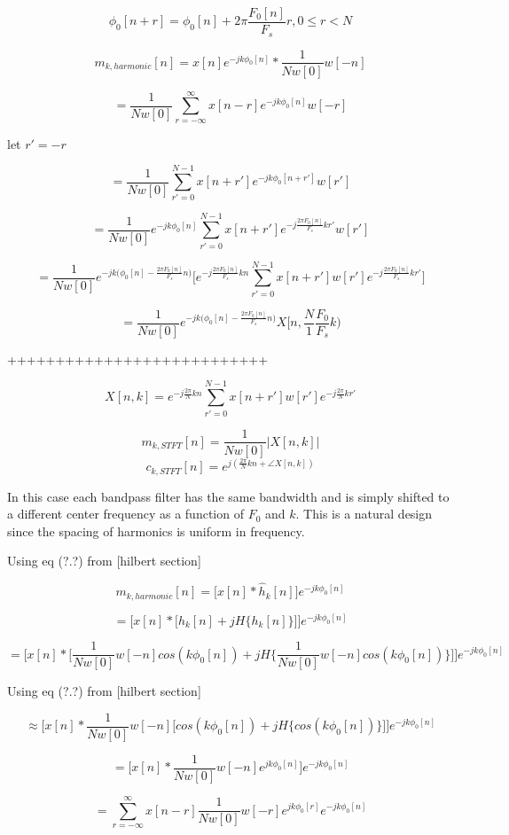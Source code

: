 \documentclass [11pt, proquest] {uwthesis}[2015/03/03]
\begin{document}
$$\phi_0[n + r] = \phi_0[n] + 2\pi \frac{F_0[n]}{F_s}r, 0 \leq r < N$$

$$m_{k,harmonic}[n] = x[n] e^{-jk\phi_0 [n]} *  \frac{1}{Nw[0]} w[-n]$$

$$= \frac{1}{Nw[0]} \sum_{r = -\infty}^\infty x[n - r] e^{-jk\phi_0 [n]} w[-r]$$

let $r' = -r$

$$= \frac{1}{Nw[0]} \sum_{r' = 0}^{N-1} x[n + r'] e^{-jk\phi_0 [n + r']} w[r']$$

$$= \frac{1}{Nw[0]} e^{-jk \phi_0[n]} \sum_{r' = 0}^{N-1} x[n + r'] e^{-j \frac{2\pi F_0[n]}{F_s}kr'} w[r']$$

$$= \frac{1}{Nw[0]} e^{-jk \Big(\phi_0[n] - \frac{2\pi F_0[n]}{F_s}n \Big)} \Bigg[ e^{-j \frac{2\pi F_0[n]}{F_s}kn} \sum_{r' = 0}^{N-1} x[n + r'] w[r'] e^{-j \frac{2\pi F_0[n]}{F_s}kr'} \Bigg]$$

$$= \frac{1}{Nw[0]} e^{-jk \Big(\phi_0[n] - \frac{2\pi F_0[n]}{F_s}n \Big)} X[n, \frac{N}{1} \frac{F_0}{F_s} k)$$

+++++++++++++++++++++++++++

$$X[n,k] = e^{-j\frac{2\pi}{N}kn} \sum\limits_{r'=0}^{N-1} x[n + r'] w[r'] e^{-j\frac{2\pi}{N}kr'}$$


$$m_{k,STFT}[n] =  \frac{1}{Nw[0]}  \vert X[n,k]\vert$$
$$c_{k,STFT}[n] = e^{j(\frac{2\pi}{N}kn + \angle X[n,k])}$$


In this case each bandpass filter has the same bandwidth and is simply shifted to a different center frequency as a function of $F_0$ and $k$.  This is a natural design since the spacing of harmonics is uniform in frequency.

Using eq (?.?) from [hilbert section]

$$m_{k,harmonic}[n] =  \Big[ x[n] * \widehat{h}_k[n] \Big] e^{-jk \phi_0[n]}$$

$$=  \Bigg[ x[n] * \Big[ h_k[n]+  jH\{h_k[n]\} \Big] \Bigg] e^{-jk \phi_0[n]}$$

$$=  \Bigg[ x[n] * \Big[ \frac{1}{Nw[0]} w[-n] cos( k \phi_0[n]) +  jH\{\frac{1}{Nw[0]} w[-n] cos( k \phi_0[n])\} \Big] \Bigg] e^{-jk \phi_0[n]}$$

Using eq (?.?) from [hilbert section]

$$\approx  \Bigg[ x[n] *  \frac{1}{Nw[0]} w[-n] \Big[cos( k \phi_0[n]) +  jH\{cos( k \phi_0[n])\} \Big] \Bigg] e^{-jk \phi_0[n]}$$

$$=  \Bigg[ x[n] *  \frac{1}{Nw[0]} w[-n] e^{jk \phi_0[n]} \Bigg] e^{-jk \phi_0[n]}$$

$$= \sum_{r = -\infty}^\infty x[n - r] \frac{1}{Nw[0]}w[-r] e^{jk \phi_0[r]} e^{-jk \phi_0[n]}$$
\end{document}
